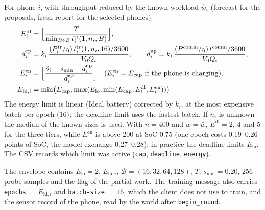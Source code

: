 \documentclass[11pt,a4paper]{article}
\newcommand{\cf}[1]{\texttt{#1}}
\begin{document}
For phone $i$, with throughput reduced by the known workload $\hat{w}_i$
(forecast for the proposals, fresh report for the selected phones):
\begin{align}
  E^{\mathrm{dl}}_i &= \Bigl\lfloor \frac{T}{\min_{B \in \mathcal{B}} t^{\mathrm{tr}}_i(1, n_i, B)} \Bigr\rfloor ,\\
  d^{\mathrm{ep}}_i &= k_i \, \frac{(P^{\mathrm{tr}}_i / \eta) \, t^{\mathrm{tr}}_i(1, n_i, 16) / 3600}{V_0 Q_i}, \qquad
  d^{\mathrm{up}}_i = k_i \, \frac{(P^{\mathrm{comm}} / \eta) \, t^{\mathrm{comm}} / 3600}{V_0 Q_i} ,\\
  E^{\mathrm{en}}_i &= \Bigl\lfloor \frac{\hat{s}_i - s_{\min} - d^{\mathrm{up}}_i}{d^{\mathrm{ep}}_i} \Bigr\rfloor
      \quad (E^{\mathrm{en}}_i = E_{\mathrm{cap}} \text{ if the phone is charging}) ,\\
  E_{\mathrm{hi},i} &= \min\bigl(E_{\mathrm{cap}}, \max(E_{\mathrm{lo}}, \min(E_{\mathrm{cap}}, E^{\mathrm{dl}}_i, E^{\mathrm{en}}_i))\bigr) .
\end{align}
The energy limit is linear (Ideal battery) corrected by $k_i$, at the most
expensive batch per epoch (16); the deadline limit uses the fastest batch. If
$n_i$ is unknown the median of the known sizes is used. With $n = 400$ and
$w = \bar{w}$, $E^{\mathrm{dl}} = 2$, 4 and 5 for the three tiers, while
$E^{\mathrm{en}}$ is above 200 at SoC 0.75 (one epoch costs 0.19--0.26 points of
SoC, the model exchange 0.27--0.28): in practice the deadline limits $E_{\mathrm{hi}}$.
The CSV records which limit was active (\cf{cap}, \cf{deadline},
\cf{energy}).

The envelope contains $E_{\mathrm{lo}} = 2$, $E_{\mathrm{hi},i}$, $\mathcal{B}
= (16, 32, 64, 128)$, $T$, $s_{\min} = 0.20$, 256 probe samples and the flag of
the partial work. The training message also carries \cf{epochs}
$= E_{\mathrm{hi},i}$ and \cf{batch-size} $= 16$, which the client does not use
to train, and the sensor record of the phone, read by the world after
\cf{begin\_round}.
\end{document}
